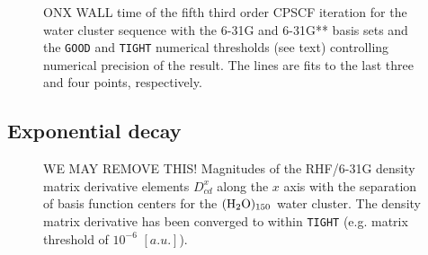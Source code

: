 \documentclass[prl,aps,twocolumn,showpacs,twocolumngrid,superbib]{revtex4}
\begin{document}
\begin{figure}[t]
  \caption{\protect
    ONX WALL time of the fifth third order CPSCF iteration for
    the water cluster sequence with the 6-31G and 6-31G** 
    basis sets and the {\tt GOOD} and {\tt TIGHT} 
    numerical thresholds (see text) controlling numerical
    precision of the result. The lines are fits to the 
    last three and four points, respectively.
  }\label{fig:Gamma_ONX_Timing}
\end{figure}




\subsection{Exponential decay}

\begin{figure}[t]
  \caption{\protect
    WE MAY REMOVE THIS!
    Magnitudes of the RHF/6-31G density matrix derivative elements $D^{x}_{cd}$
    along the $x$ axis with the separation of basis function centers
    for the $\rm (H_2O)_{150}$ water cluster. The density matrix 
    derivative has been converged to within {\tt TIGHT} (e.g. 
    matrix threshold of $10^{-6}$ $[a.u.]$).
  }\label{fig:Alpha_Decay}
\end{figure}
\end{document}

